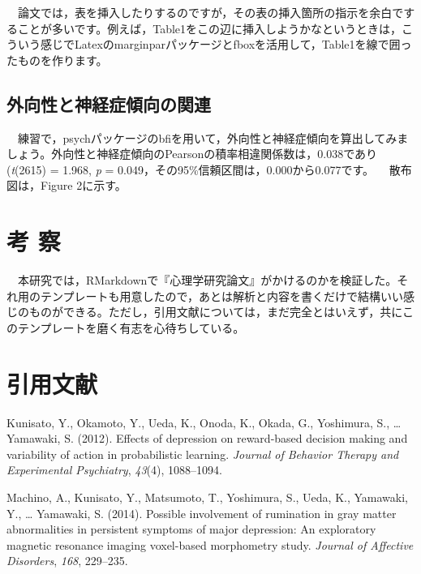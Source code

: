 \documentclass[11pt,a4paper,xelatex,ja=standard]{bxjsarticle}
\begin{document}
　論文では，表を挿入したりするのですが，その表の挿入箇所の指示を余白ですることが多いです。例えば，Table1をこの辺に挿入しようかなというときは，こういう感じでLatexのmarginparパッケージとfboxを活用して，Table1を線で囲ったものを作ります。

\hypertarget{ux5916ux5411ux6027ux3068ux795eux7d4cux75c7ux50beux5411ux306eux95a2ux9023}{%
\subsection{外向性と神経症傾向の関連}\label{ux5916ux5411ux6027ux3068ux795eux7d4cux75c7ux50beux5411ux306eux95a2ux9023}}

　練習で，psychパッケージのbfiを用いて，外向性と神経症傾向を算出してみましょう。外向性と神経症傾向のPearsonの積率相違関係数は，0.038であり(\emph{t}(2615)
= 1.968, \emph{p} = 0.049，その95\%信頼区間は，0.000から0.077です。
　散布図は，Figure 2に示す。

\hypertarget{ux8003-ux5bdf}{%
\section{考 察}\label{ux8003-ux5bdf}}

　本研究では，RMarkdownで『心理学研究論文』がかけるのかを検証した。それ用のテンプレートも用意したので，あとは解析と内容を書くだけで結構いい感じのものができる。ただし，引用文献については，まだ完全とはいえず，共にこのテンプレートを磨く有志を心待ちしている。

\clearpage

\hypertarget{ux5f15ux7528ux6587ux732e}{%
\section{引用文献}\label{ux5f15ux7528ux6587ux732e}}

\hypertarget{refs}{}
\leavevmode\hypertarget{ref-Kunisato2012}{}%
Kunisato, Y., Okamoto, Y., Ueda, K., Onoda, K., Okada, G., Yoshimura,
S., \ldots{} Yamawaki, S. (2012). Effects of depression on reward-based
decision making and variability of action in probabilistic learning.
\emph{Journal of Behavior Therapy and Experimental Psychiatry},
\emph{43}(4), 1088--1094.

\leavevmode\hypertarget{ref-Machino2014}{}%
Machino, A., Kunisato, Y., Matsumoto, T., Yoshimura, S., Ueda, K.,
Yamawaki, Y., \ldots{} Yamawaki, S. (2014). Possible involvement of
rumination in gray matter abnormalities in persistent symptoms of major
depression: An exploratory magnetic resonance imaging voxel-based
morphometry study. \emph{Journal of Affective Disorders}, \emph{168},
229--235.
\end{document}
